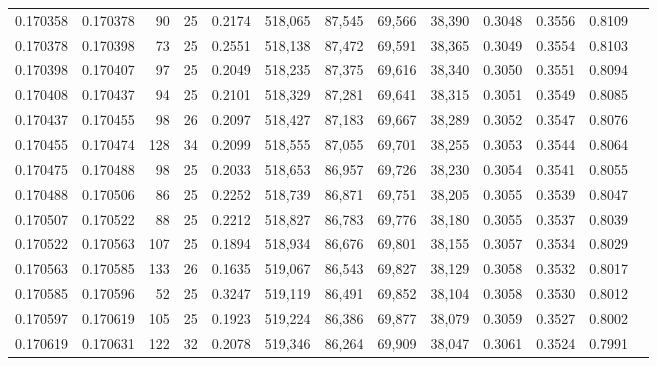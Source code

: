 \begin{tabular}{rrrrrrrrrrrrr}
0.170358 & 0.170378 &  90 &  25 &                                     0.2174 & 518,065 &  87,545 &  69,566 &  38,390 & 0.3048 & 0.3556 & 0.8109 \\
0.170378 & 0.170398 &  73 &  25 &                                     0.2551 & 518,138 &  87,472 &  69,591 &  38,365 & 0.3049 & 0.3554 & 0.8103 \\
0.170398 & 0.170407 &  97 &  25 &                                     0.2049 & 518,235 &  87,375 &  69,616 &  38,340 & 0.3050 & 0.3551 & 0.8094 \\
0.170408 & 0.170437 &  94 &  25 &                                     0.2101 & 518,329 &  87,281 &  69,641 &  38,315 & 0.3051 & 0.3549 & 0.8085 \\
0.170437 & 0.170455 &  98 &  26 &                                     0.2097 & 518,427 &  87,183 &  69,667 &  38,289 & 0.3052 & 0.3547 & 0.8076 \\
0.170455 & 0.170474 & 128 &  34 &                                     0.2099 & 518,555 &  87,055 &  69,701 &  38,255 & 0.3053 & 0.3544 & 0.8064 \\
0.170475 & 0.170488 &  98 &  25 &                                     0.2033 & 518,653 &  86,957 &  69,726 &  38,230 & 0.3054 & 0.3541 & 0.8055 \\
0.170488 & 0.170506 &  86 &  25 &                                     0.2252 & 518,739 &  86,871 &  69,751 &  38,205 & 0.3055 & 0.3539 & 0.8047 \\
0.170507 & 0.170522 &  88 &  25 &                                     0.2212 & 518,827 &  86,783 &  69,776 &  38,180 & 0.3055 & 0.3537 & 0.8039 \\
0.170522 & 0.170563 & 107 &  25 &                                     0.1894 & 518,934 &  86,676 &  69,801 &  38,155 & 0.3057 & 0.3534 & 0.8029 \\
0.170563 & 0.170585 & 133 &  26 &                                     0.1635 & 519,067 &  86,543 &  69,827 &  38,129 & 0.3058 & 0.3532 & 0.8017 \\
0.170585 & 0.170596 &  52 &  25 &                                     0.3247 & 519,119 &  86,491 &  69,852 &  38,104 & 0.3058 & 0.3530 & 0.8012 \\
0.170597 & 0.170619 & 105 &  25 &                                     0.1923 & 519,224 &  86,386 &  69,877 &  38,079 & 0.3059 & 0.3527 & 0.8002 \\
0.170619 & 0.170631 & 122 &  32 &                                     0.2078 & 519,346 &  86,264 &  69,909 &  38,047 & 0.3061 & 0.3524 & 0.7991 \\

\end{tabular}
